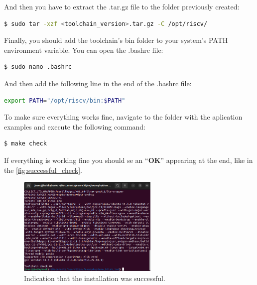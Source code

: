             And then you have to extract the .tar.gz file to the folder previously created:
            
                \begin{lstlisting}[style=mystyle_bash, language=bash]
                    $ sudo tar -xzf <toolchain_version>.tar.gz -C /opt/riscv/
                \end{lstlisting}
                
            Finally, you should add the toolchain's bin folder to your system's PATH environment variable. You can open the .bashrc file:
            
                \begin{lstlisting}[style=mystyle_bash, language=bash]
                    $ sudo nano .bashrc
                \end{lstlisting}
                
            And then add the following line in the end of the .bashrc file:
            
                \begin{lstlisting}[style=mystyle_bash, language=bash]
                    export PATH="/opt/riscv/bin:$PATH"
                \end{lstlisting}
                
            To make sure everything works fine, navigate to the folder with the aplication examples and execute the following command:
            
                \begin{lstlisting}[style=mystyle_bash, language=bash]
                    $ make check
                \end{lstlisting}
            
            If everything is working fine you should se an ``\textbf{OK}'' appearing at the end, like in the \autoref{fig:successful_check}.
            
                \begin{figure}[!ht]
                    \begin{center}
                        \includegraphics[width= 0.6\textwidth]{figures/successful_check.png}
                        \caption{Indication that the installation was successful.}
                        \label{fig:successful_check}
                    \end{center}
                \end{figure}
        

